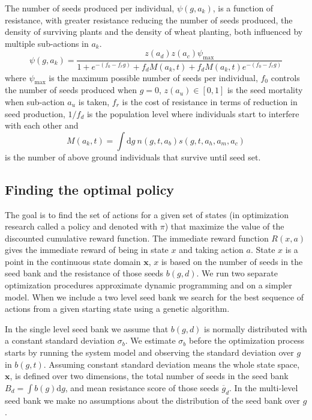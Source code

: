 \documentclass[12pt, a4paper]{article}
\begin{document}
The number of seeds produced per individual, $\psi(g, a_k)$, is a function of resistance, with greater resistance reducing the number of seeds produced, the density of surviving plants and the density of wheat planting, both influenced by multiple sub-actions in $a_k$. 
\begin{equation}\label{eq:seed_production}
	\psi(g, a_k) = \frac{z(a_d)z(a_c)\psi_\text{max}}{1 + e^{-(f_0 - f_rg)} + f_d M(a_k, t) + f_dM(a_k, t) e^{-(f_0 - f_rg)}}
\end{equation}  
where $\psi_\text{max}$ is the maximum possible number of seeds per individual, $f_0$ controls the number of seeds produced when $g = 0$, $z(a_u) \in [0, 1]$ is the seed mortality when sub-action $a_u$ is taken, $f_r$ is the cost of resistance in terms of reduction in seed production, $1/f_d$ is the population level where individuals start to interfere with each other and 
\begin{equation}\label{eq:num_ind}
	M(a_k, t) = \int \text{d}g~n(g, t, a_b)s(g, t, a_h, a_m, a_c)  
\end{equation}
is the number of above ground individuals that survive until seed set.

\subsection{Finding the optimal policy}
The goal is to find the set of actions for a given set of states (in optimization research called a policy and denoted with $\pi$) that maximize the value of the discounted cumulative reward function. The immediate reward function $R(x, a)$ gives the immediate reward of being in state $x$ and taking action $a$. State $x$ is a point in the continuous state domain $\mathbf{x}$, $x$ is based on the number of seeds in the seed bank and the resistance of those seeds $b(g, d)$. We run two separate optimization procedures approximate dynamic programming and on a simpler model. When we include a two level seed bank we search for the best sequence of actions from a given starting state using a genetic algorithm.       

In the single level seed bank we assume that $b(g, d)$ is normally distributed with a constant standard deviation $\sigma_b$. We estimate $\sigma_b$ before the optimization process starts by running the system model and observing the standard deviation over $g$ in $b(g, t)$. Assuming constant standard deviation means the whole state space, $\mathbf{x}$, is defined over two dimensions, the total number of seeds in the seed bank $B_d = \int b(g)\text{d}g$, and mean resistance score of those seeds $\overline{g}_d$. In the multi-level seed bank we make no assumptions about the distribution of the seed bank over $g$.   
\end{document}
